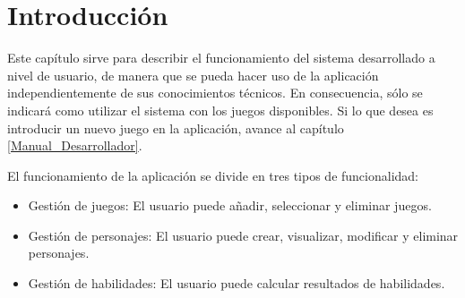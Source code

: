 
\section{Introducción}
Este capítulo sirve para describir el funcionamiento del sistema desarrollado a nivel de usuario, de manera que 
se pueda hacer uso de la aplicación independientemente de sus conocimientos técnicos. En consecuencia, sólo 
se indicará como utilizar el sistema con los juegos disponibles. Si lo que desea es introducir un nuevo juego 
en la aplicación, avance al capítulo \ref*{Manual_Desarrollador}.\medskip

El funcionamiento de la aplicación se divide en tres tipos de funcionalidad:
\begin{itemize}
    \item Gestión de juegos: El usuario puede añadir, seleccionar y eliminar juegos.
    \item Gestión de personajes: El usuario puede crear, visualizar, modificar y eliminar personajes.
    \item Gestión de habilidades: El usuario puede calcular resultados de habilidades.
\end{itemize}

